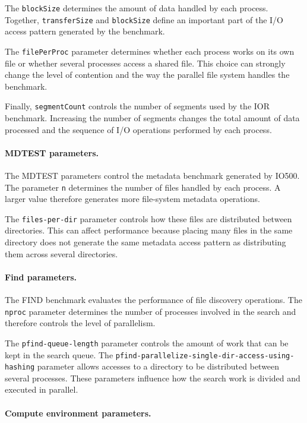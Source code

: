 The \texttt{blockSize} determines the amount of data handled by each
process. Together, \texttt{transferSize} and \texttt{blockSize} define an
important part of the I/O access pattern generated by the benchmark.

The \texttt{filePerProc} parameter determines whether each process works
on its own file or whether several processes access a shared file. This
choice can strongly change the level of contention and the way the
parallel file system handles the benchmark.

Finally, \texttt{segmentCount} controls the number of segments used by the
IOR benchmark. Increasing the number of segments changes the total amount
of data processed and the sequence of I/O operations performed by each
process.

\paragraph{MDTEST parameters.}

The MDTEST parameters control the metadata benchmark generated by IO500.
The parameter \texttt{n} determines the number of files handled by each
process. A larger value therefore generates more file-system metadata
operations.

The \texttt{files-per-dir} parameter controls how these files are
distributed between directories. This can affect performance because
placing many files in the same directory does not generate the same
metadata access pattern as distributing them across several directories.

\paragraph{Find parameters.}

The FIND benchmark evaluates the performance of file discovery operations.
The \texttt{nproc} parameter determines the number of processes involved
in the search and therefore controls the level of parallelism.

The \texttt{pfind-queue-length} parameter controls the amount of work that
can be kept in the search queue. The
\texttt{pfind-parallelize-single-dir-access-using-hashing} parameter
allows accesses to a directory to be distributed between several
processes. These parameters influence how the search work is divided and
executed in parallel.

\paragraph{Compute environment parameters.}

